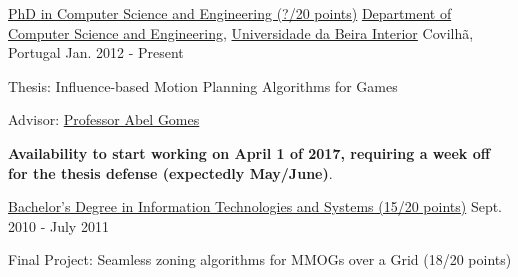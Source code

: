 

\begin{cventries}

  \cventry
    {\href{https://www.ubi.pt/en/course/849}{PhD in Computer Science and Engineering (?/20 points)}} %
    {\href{https://www.di.ubi.pt/}{Department of Computer Science and Engineering}, \href{http://www.ubi.pt/}{Universidade da Beira Interior}} %
    {Covilh\~{a}, Portugal} %
    {Jan. 2012 - Present} %
    {
      \begin{cvitems} %
        \item {Thesis: Influence-based Motion Planning Algorithms for Games}
        \item {Advisor: \href{http://www.di.ubi.pt/~agomes/}{Professor Abel Gomes}}
        \item {\textbf{Availability to start working on April 1 of 2017, requiring a week off for the thesis defense (expectedly May/June)}.}
      \end{cvitems}
    }

  \cventry
    {\href{https://www.ubi.pt/en/course/64}{Bachelor's Degree in Information Technologies and Systems (15/20 points)}} %
    {} %
    {} %
    {Sept. 2010 - July 2011} %
    {
      \begin{cvitems} %
        \item {Final Project: Seamless zoning algorithms for MMOGs over a Grid (18/20 points)}
      \end{cvitems}
    }
  

\end{cventries}
